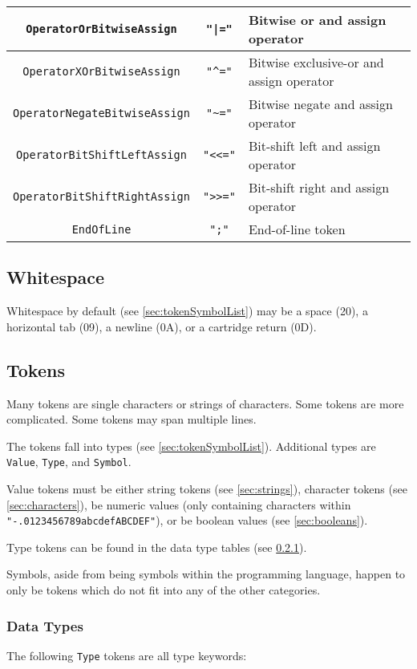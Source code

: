 \documentclass[10pt,a4paper]{article}
\begin{document}
\begin{center}
\begin{tabular}{|c|c|l|}
\hline
\verb|OperatorOrBitwiseAssign| & \verb!"|="! & Bitwise or and assign operator \\
\hline
\verb|OperatorXOrBitwiseAssign| & \verb|"^="| & Bitwise exclusive-or and assign operator \\
\hline
\verb|OperatorNegateBitwiseAssign| & \verb|"~="| & Bitwise negate and assign operator \\
\hline
\verb|OperatorBitShiftLeftAssign| & \verb|"<<="| & Bit-shift left and assign operator \\
\hline
\verb|OperatorBitShiftRightAssign| & \verb|">>="| & Bit-shift right and assign operator \\
\hline
\verb|EndOfLine| & \verb|";"| & End-of-line token \\
\hline
\end{tabular}
\end{center}

\subsection{Whitespace}
\label{sec:whitespace}
Whitespace by default (see \ref{sec:tokenSymbolList}) may be a space (20), a horizontal tab (09), a newline (0A), or a cartridge return (0D). 

\subsection{Tokens}
\label{sec:operations}
Many tokens are single characters or strings of characters. Some tokens are more complicated. Some tokens may span multiple lines.

The tokens fall into types (see \ref{sec:tokenSymbolList}). Additional types are \verb|Value|, \verb|Type|, and \verb|Symbol|. 

Value tokens must be either string tokens (see \ref{sec:strings}), character tokens (see \ref{sec:characters}), be numeric values (only containing characters within \verb|"-.0123456789abcdefABCDEF"|), or be boolean values (see \ref{sec:booleans}).

Type tokens can be found in the data type tables (see \ref{sec:dataTypes}).

Symbols, aside from being symbols within the programming language, happen to only be tokens which do not fit into any of the other categories. 

\subsubsection{Data Types}
\label{sec:dataTypes}
The following \verb|Type| tokens are all type keywords:
\end{document}
